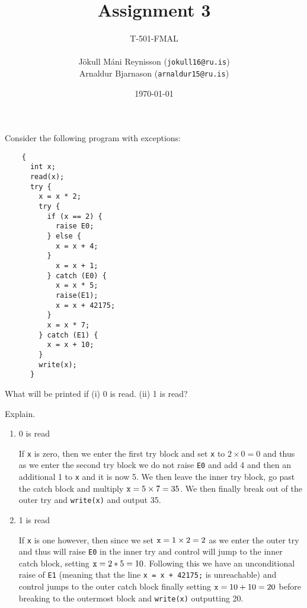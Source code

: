 \documentclass[11pt]{exam}
\begin{document}
\title{Assignment 3}
    \author{{\small T-501-FMAL} \\ \quad \\ Jökull Máni Reynisson ({\tt jokull16@ru.is}) \\  Arnaldur Bjarnason ({\tt arnaldur15@ru.is})}
\date{\today}
\maketitle

\begin{questions}


\question Consider the following program with exceptions:
  \begin{lstlisting}
    {
      int x;
      read(x);
      try {
        x = x * 2;
        try {
          if (x == 2) {
            raise E0;
          } else {
            x = x + 4;
          }
            x = x + 1;
          } catch (E0) {
            x = x * 5;
            raise(E1);
            x = x + 42175;
          }
          x = x * 7;
        } catch (E1) {
          x = x + 10;
        }
        write(x);
      }
  \end{lstlisting}
What will be printed if (i) 0 is read. (ii) 1 is read?

Explain.

        \begin{enumerate}[label=(\roman*)]
            \item 0 is read
                \begin{framed}
                    If {\tt x} is zero, then we enter the first try block and set {\tt x} to $2\times 0 = 0$ and thus as we enter the second try block we do not raise {\tt E0} and add 4 and then an additional 1 to {\tt x} and it is now 5. We then leave the inner try block, go past the catch block and multiply ${\tt x} = 5 \times 7 = 35$.
                    We then finally break out of the outer try and {\tt write(x)} and output 35.
                \end{framed}

            \item 1 is read
                \begin{framed}
                    If {\tt x} is one however, then since we set ${\tt x} = 1 \times 2 = 2$ as we enter the outer try and thus will raise {\tt E0} in the inner try and control will jump to the inner catch block, setting ${\tt x} = 2 * 5 = 10$. Following this we have an unconditional raise of {\tt E1} (meaning that the line {\tt x = x + 42175;} is unreachable) and control jumps to the outer catch block finally setting ${\tt x} = 10 + 10 = 20$ before breaking to the outermost block and {\tt write(x)} outputting 20.
                \end{framed}
        \end{enumerate}




\end{questions}
\end{document}
